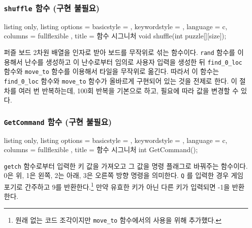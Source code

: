 \documentclass{article}
\newcommand{\code}[1]{
  \texttt{\large{#1}}
}
\begin{document}
\subsubsection{\code{shuffle} 함수 (구현 불필요)}

\begin{tcblisting}{
    listing only,
    listing options = {
      basicstyle = \ttfamily,
      keywordstyle = \color{blue},
      language = c,
      columns = fullflexible
    },
    title = 함수 시그니처
  }void shuffle(int puzzle[][size]);
\end{tcblisting}

퍼즐 보드 2차원 배열을 인자로 받아 보드를 무작위로 섞는 함수이다. \code{rand} 함수를 이용해서 난수를 생성하고 이 난수로부터 임의로 사용자 입력을 생성한 뒤 \code{find\_0\_loc} 함수와 \code{move\_to} 함수를 이용해서 타일을 무작위로 옮긴다. 따라서 이 함수는 \code{find\_0\_loc} 함수와 \code{move\_to} 함수가 올바르게 구현되어 있는 것을 전제로 한다. 이 절차를 여러 번 반복하는데, 100회 반복을 기본으로 하고, 필요에 따라 값을 변경할 수 있다.

\subsubsection{\code{GetCommand} 함수 (구현 불필요)}

\begin{tcblisting}{
    listing only,
    listing options = {
      basicstyle = \ttfamily,
      keywordstyle = \color{blue},
      language = c,
      columns = fullflexible
    },
    title = 함수 시그니처
  }int GetCommand();
\end{tcblisting}

\code{getch} 함수로부터 입력한 키 값을 가져오고 그 값을 명령 플래그로 바꿔주는 함수이다. 0은 위, 1은 왼쪽, 2는 아래, 3은 오른쪽 방향 명령을 의미한다. \code{Q}를 입력한 경우 게임 포기로 간주하고 9를 반환한다.\footnote{원래 없는 코드 조각이지만 \texttt{move\_to} 함수에서의 사용을 위해 추가했다.} 만약 유효한 키가 아닌 다른 키가 입력되면 -1을 반환한다.
\end{document}

